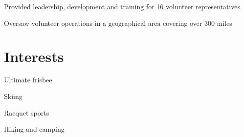 \documentclass[letterpaper]{deedy-resume} %
\begin{document}
\begin{minipage}[t]{0.28\textwidth}

\vspace{\topsep} %
\begin{tightitemize}
\item Provided leadership, development and training for 16 volunteer representatives
\item Oversaw volunteer operations in a geographical area covering over 300 miles
\end{tightitemize}

\sectionspace %


\section{Interests}

\vspace{\topsep} %
\begin{tightitemize}
\item Ultimate frisbee
\item Skiing
\item Racquet sports
\item Hiking and camping
\end{tightitemize}

\sectionspace %



\end{minipage} %
\end{document}
